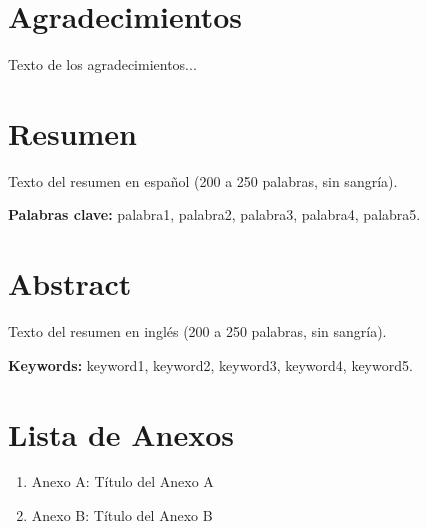 \documentclass[12pt,openright,oneside]{book}
\begin{document}
\chapter*{Agradecimientos}
Texto de los agradecimientos...


\chapter*{Resumen}

\begin{spacing}{1}
    Texto del resumen en español (200 a 250 palabras, sin sangría).
\end{spacing}

\vspace{1cm}

\textbf{Palabras clave:} palabra1, palabra2, palabra3, palabra4, palabra5.

\newpage  %

\chapter*{Abstract}

\begin{spacing}{1}
    Texto del resumen en inglés (200 a 250 palabras, sin sangría).
\end{spacing}

\vspace{1cm}

\textbf{Keywords:} keyword1, keyword2, keyword3, keyword4, keyword5.

\newpage  %

\tableofcontents
\newpage

\listoftables
{}
\newpage

\listoffigures
{}
\newpage

\chapter*{Lista de Anexos}
\begin{enumerate}
    \item Anexo A: Título del Anexo A
    \item Anexo B: Título del Anexo B
\end{enumerate}
\end{document}
